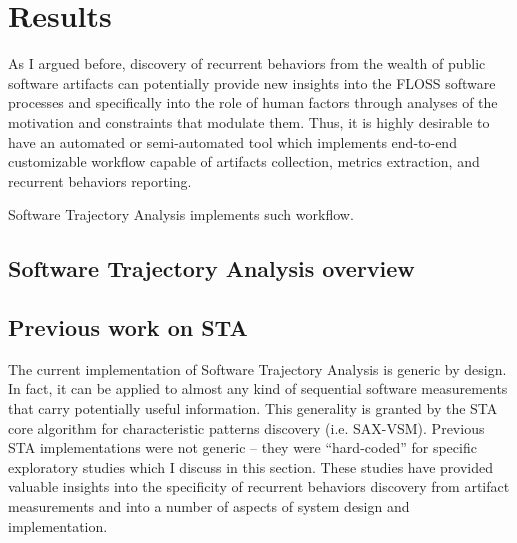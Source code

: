 \chapter{Results}\label{chapter_sta}
As I argued before, discovery of recurrent behaviors from the wealth of public software artifacts can potentially 
provide new insights into the FLOSS software processes and specifically into the role of human factors through 
analyses of the motivation and constraints that modulate them. 
Thus, it is highly desirable to have an automated or semi-automated tool which implements end-to-end 
customizable workflow capable of artifacts collection, metrics extraction, and recurrent behaviors reporting.

Software Trajectory Analysis implements such workflow. 

\section{Software Trajectory Analysis overview}


\section{Previous work on STA}
The current implementation of Software Trajectory Analysis is generic by design. In fact, it can be applied 
to almost any kind of sequential software measurements that carry potentially useful information. 
This generality is granted by the STA core algorithm for characteristic patterns discovery (i.e. SAX-VSM). 
Previous STA implementations were not generic -- they were ``hard-coded'' for specific exploratory studies 
which I discuss in this section. These studies have provided valuable insights into the specificity of recurrent 
behaviors discovery from artifact measurements and into a number of aspects of system design and 
implementation.

